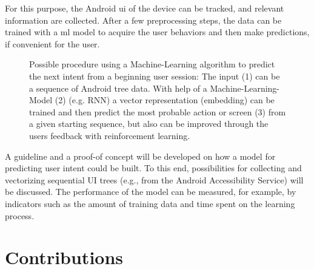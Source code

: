 For this purpose, the Android \gls{ui} of the device can be tracked, and relevant information are collected.
After a few preprocessing steps, the data can be trained with a \gls{ml} model to acquire the user behaviors and then make predictions, if convenient for the user.

\begin{figure}[htbp!]
    \centering
    
    \caption[Schema of ML-algorithm predicting user intent]{
        Possible procedure using a Machine-Learning algorithm to predict the next intent from a beginning user session:
        The input (1) can be a sequence of Android tree data.
        With help of a Machine-Learning-Model (2) (e.g. RNN) a vector representation (embedding) can be trained and then predict the most probable action or screen (3) from a given starting sequence, but also can be improved through the users feedback with reinforcement learning.
    }
    \label{fig:encode-decode}
\end{figure}

A guideline and a proof-of concept will be developed on how a model for predicting user intent could be built.
To this end, possibilities for collecting and vectorizing sequential UI trees (e.g., from the Android Accessibility Service) will be discussed.
The performance of the model can be measured, for example, by indicators such as the amount of training data and time spent on the learning process.

\section{Contributions}

%

